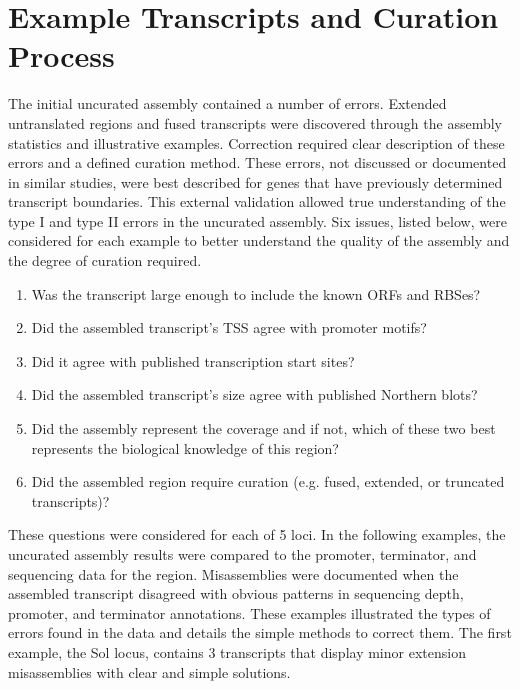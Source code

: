 



\section{Example Transcripts and Curation Process}
The initial uncurated assembly contained a number of errors. Extended untranslated regions and fused transcripts were discovered through the assembly statistics and illustrative examples. Correction required clear description of these errors and a defined curation method. These errors, not discussed or documented in similar studies, were best described for genes that have previously determined transcript boundaries. This external validation allowed true understanding of the type I and type II errors in the uncurated assembly. Six issues, listed below, were considered for each example to better understand the quality of the assembly and the degree of curation required. 

\begin{enumerate}
\item Was the transcript large enough to include the known ORFs and RBSes?
\item Did the assembled transcript's TSS agree with promoter motifs?
\item Did it agree with published transcription start sites?
\item Did the assembled transcript's size agree with published Northern blots?
\item Did the assembly represent the coverage and if not, which of these two best represents the biological knowledge of this region?
\item Did the assembled region require curation (e.g. fused, extended, or truncated transcripts)?
\end{enumerate}

These questions were considered for each of 5 loci. In the following examples, the uncurated assembly results were compared to the promoter, terminator, and sequencing data for the region. Misassemblies were documented when the assembled transcript disagreed with obvious patterns in sequencing depth, promoter, and terminator annotations. These examples illustrated the types of errors found in the data and details the simple methods to correct them. The first example, the Sol locus, contains 3 transcripts that display minor extension misassemblies with clear and simple solutions. 

